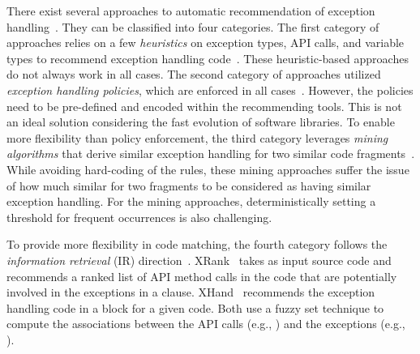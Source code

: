 There exist several approaches to automatic recommendation of 
exception
handling~\cite{barbosa-bsse12,chanchal-scam14,barbosa-tse18,barbosa-tse16,xrank-fse20,throw-ase22}. They
can be classified into four categories. The first category of
approaches relies on a few {\em heuristics} on exception types, API
calls, and variable types to recommend exception handling
code~\cite{barbosa-bsse12}. These heuristic-based approaches do not
always work in all cases. The second category of approaches
utilized {\em exception handling policies}, which are enforced in all
cases~\cite{barbosa-tse16,barbosa-saner18}. However, the policies need
to be pre-defined and encoded within the recommending tools.  This is not
an ideal solution considering the fast evolution of software
libraries. To enable more flexibility than policy enforcement, the
third category leverages {\em mining algorithms} that derive
similar exception handling for two similar code
fragments~\cite{chanchal-scam14}. While avoiding hard-coding of
the rules, these mining approaches suffer the issue of how much similar
for two fragments to be considered as having similar exception
handling. For the mining approaches, deterministically setting a
threshold for frequent occurrences is also challenging.

To provide more flexibility in code matching, the fourth category
follows the {\em information retrieval} (IR)
direction~\cite{xrank-fse20}. XRank~\cite{xrank-fse20} takes as input
source code and recommends a ranked list of API method calls in the
code that are potentially involved in the exceptions in a 
clause. XHand~\cite{xrank-fse20} recommends the exception handling
code in a  block for a given code. Both use a
fuzzy set technique to compute the associations between the API calls
(e.g., ) and the exceptions (e.g.,
).

